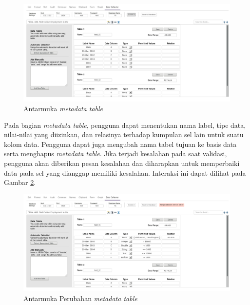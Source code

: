 \begin{figure}[htbp]
	\centering
	\includegraphics[width=1.0\textwidth]{resources/chapter-4-interface-2.png}
	\caption{Antarmuka \textit{metadata table}}
	\label{Antarmuka2}
\end{figure}

Pada bagian \textit{metadata table}, pengguna dapat menentukan nama label, tipe data, nilai-nilai yang diizinkan, dan relasinya terhadap kumpulan sel lain untuk suatu kolom data. Pengguna dapat juga mengubah nama tabel tujuan ke basis data serta menghapus \textit{metadata table}. Jika terjadi kesalahan pada saat validasi, pengguna akan diberikan pesan kesalahan dan diharapkan untuk memperbaiki data pada sel yang dianggap memiliki kesalahan. Interaksi ini dapat dilihat pada Gambar \ref{Antarmuka3}.

\begin{figure}[htbp]
	\centering
	\includegraphics[width=1.0\textwidth]{resources/chapter-4-interface-3a.png}
	\caption{Antarmuka Perubahan \textit{metadata table}}
	\label{Antarmuka3}
\end{figure}

